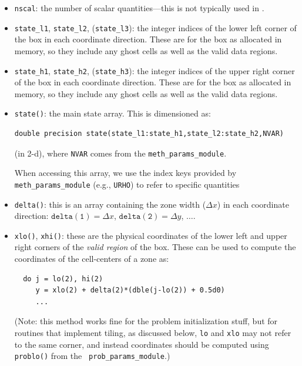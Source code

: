 \begin{itemize}
\begin{itemize}
\begin{itemize}
    \item {\tt nscal}: the number of scalar quantities---this is not typically
      used in \castro.

    \item {\tt state\_l1}, {\tt state\_l2}, ({\tt state\_l3}): the
      integer indices of the lower left corner of the box in each
      coordinate direction.  These are for the box as allocated in memory,
      so they include any ghost cells as well as the valid data regions.

    \item {\tt state\_h1}, {\tt state\_h2}, ({\tt state\_h3}): the
      integer indices of the upper right corner of the box in each
      coordinate direction.  These are for the box as allocated in memory,
      so they include any ghost cells as well as the valid data regions.

    \item {\tt state()}: the main state array.  This is dimensioned as:
\begin{verbatim}
double precision state(state_l1:state_h1,state_l2:state_h2,NVAR)
\end{verbatim}
    (in 2-d), where {\tt NVAR} comes from the {\tt meth\_params\_module}.

    When accessing this array, we use the index keys provided by
    {\tt meth\_params\_module} (e.g., {\tt URHO}) to refer to specific
    quantities

    \item {\tt delta()}: this is an array containing the zone width ($\Delta x$)
      in each coordinate direction: $\mathtt{delta(1)} = \Delta x$,
      $\mathtt{delta(2)} = \Delta y$, $\ldots$.

    \item {\tt xlo()}, {\tt xhi()}: these are the physical coordinates of the
      lower left and upper right corners of the {\em valid region}
      of the box.  These can be used to compute the coordinates of the
      cell-centers of a zone as:
\begin{lstlisting}
  do j = lo(2), hi(2)
     y = xlo(2) + delta(2)*(dble(j-lo(2)) + 0.5d0)
     ...
\end{lstlisting}
     (Note: this method works fine for the problem initialization
     stuff, but for routines that implement tiling, as discussed below,
     {\tt lo} and {\tt xlo} may not refer to the same corner, and instead
     coordinates should be computed using {\tt problo()} from the {\tt
     prob\_params\_module}.)


\end{itemize}
\end{itemize}
\end{itemize}

